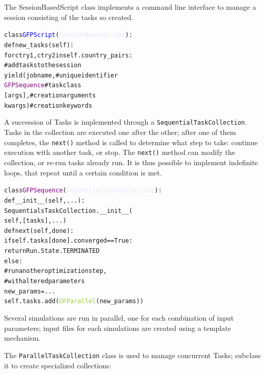 \documentclass{PoS}
\begin{document}
The SessionBasedScript class implements a command line interface to
manage a session consisting of the tasks so created.

\begin{center}
  \begin{minipage}{0.5\linewidth}
\begin{alltt}
class \textcolor{blue}{GFPScript}(\textcolor{Lavender}{SessionBasedScript}):
  def new_tasks(self):
    for ctry1, ctry2 in self.country_pairs:
      # add tasks to the session
      yield (jobname,# unique identifier 
             \textcolor{Purple}{GFPSequence}  # task class
             [ args ],  # creation arguments 
             { kwargs })# creation keywords
\end{alltt}
    \end{minipage}
  \end{center}

A succession of Tasks is implemented through a
\texttt{SequentialTaskCollection}. Tasks in the collection are
executed one after the other; after one of them completes, the
\texttt{next()} method is called to determine what step to take:
continue execution with another task, or stop. The \texttt{next()}
method can modify the collection, or re-run tasks already run. It is
thus possible to implement indefinite loops, that repeat until a
certain condition is met. 

\begin{center}
  \begin{minipage}{0.5\linewidth}
\begin{alltt}
class  \textcolor{Purple}{GFPSequence}(\textcolor{Lavender}{SequentialTaskCollection}):
  def __init__(self, ...):
    SequentialsTaskCollection.__init__(
      self, [ tasks ], ...)
  def next(self, done):
    if self.tasks[done].converged == True:
      return Run.State.TERMINATED
    else:
      # run another optimization step,
      # with altered parameters
      new_params = ...
      self.tasks.add( \textcolor{YellowGreen}{GFParallel}(new_params))
\end{alltt}
  \end{minipage}
\end{center}

Several simulations are run in parallel, one for each combination of
input parameters; input files for each simulations are created using a
template mechanism.
 
The \texttt{ParallelTaskCollection} class is used to manage concurrent
Tasks; subclass it to create specialized collections:
 
\end{document}
